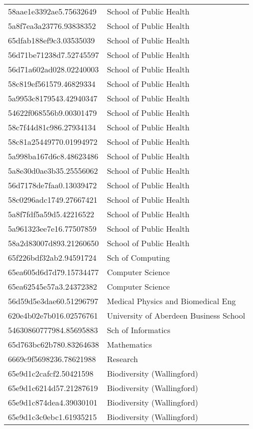 \begin{tabular}{ll}
58aae1e3392ae5.75632649 & School of Public Health \\
5a8f7ea3a23776.93838352 & School of Public Health \\
65dfab188ef9c3.03535039 & School of Public Health \\
56d71be71238d7.52745597 & School of Public Health \\
56d71a602ad028.02240003 & School of Public Health \\
58c819ef561579.46829334 & School of Public Health \\
5a9953c8179543.42940347 & School of Public Health \\
54622f068556b9.00301479 & School of Public Health \\
58c7f44d81c986.27934134 & School of Public Health \\
58c81a25449770.01994972 & School of Public Health \\
5a998ba167d6c8.48623486 & School of Public Health \\
5a8e30d0ae3b35.25556062 & School of Public Health \\
56d7178de7faa0.13039472 & School of Public Health \\
58c0296adc1749.27667421 & School of Public Health \\
5a8f7fdf5a59d5.42216522 & School of Public Health \\
5a961323ee7e16.77507859 & School of Public Health \\
58a2d83007d893.21260650 & School of Public Health \\
65f226bdf32ab2.94591724 & Sch of Computing \\
65ea605d6d7d79.15734477 & Computer Science \\
65ea62545e57a3.24372382 & Computer Science \\
56d59d5e3dae60.51296797 & Medical Physics and Biomedical Eng \\
620e4b02e7b016.02576761 & University of Aberdeen Business School \\
54630860777984.85695883 & Sch of Informatics \\
65d763bc62b780.83264638 & Mathematics \\
6669c9f5698236.78621988 & Research \\
65e9d1c2cafcf2.50421598 & Biodiversity (Wallingford) \\
65e9d1c6214d57.21287619 & Biodiversity (Wallingford) \\
65e9d1c874dea4.39030101 & Biodiversity (Wallingford) \\
65e9d1c3c0ebc1.61935215 & Biodiversity (Wallingford) \\

\end{tabular}
